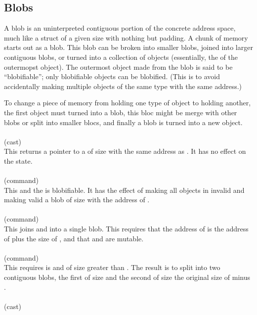 \documentclass[preprint,nocopyrightspace]{sigplanconf}
\begin{document}
{{{\subsection{Blobs}
A blob is an uninterpreted contiguous portion of the concrete address
space, much like a struct of a given size with nothing but padding. 
A chunk of memory starts out as a blob. This blob can be broken into
smaller blobs, joined into larger contiguous blobs, or turned into a
collection of objects (essentially, the  of the outermopst
object). The outermost object made from the blob is said to be
``blobifiable''; only blobifiable objects can be blobified. (This is
to avoid accidentally making multiple objects of the same type with
the same address.) 

To change a piece of memory from holding one type of object to holding
another, the first object must turned into a blob, this bloc might be 
merge with other blobs or split into smaller blocs, and finally a blob
is turned into a new object. 
\\\\
 (cast)\\
This returns a pointer to a  of size  with the same
address as . It has no effect on the state. 
\\\\
 (command)\\
This    and
the \vcc{\object} is blobifiable. It has the effect of making all
objects in  invalid and making valid a blob of
size  with the address of .
\\\\ 
 (command)\\
This joins  and  into a single blob. This requires that
the address of  is the address of  plus the size
of , and that  and  are mutable.
\\\\
 (command)\\
This requires  is \vcc{\mutable} and of size greater
than . The result is to split  into two contiguous
blobs, the first of size  and the second of size the original
size of  minus .
\\\\
 (cast) \\
}}}
\end{document}
